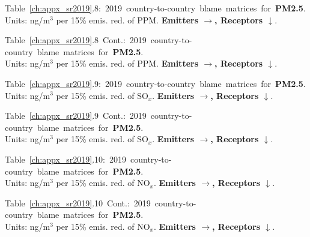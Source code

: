 \footnotesize{\mbox{Table \ref{ch:appx_sr2019}.8: 2019 country-to-country blame matrices for \textbf{PM2.5}.}\\ Units: ng/m$^3$ per 15\% emis. red. of PPM. \textbf{Emitters $\rightarrow$, Receptors $\downarrow$}. }\\[\baselineskip]\enlargethispage{\myenlarge} \hspace{-0.5cm} 
\centerline{}\clearpage
\footnotesize{\mbox{Table \ref{ch:appx_sr2019}.8 Cont.: 2019 country-to-country blame matrices for \textbf{PM2.5}.}\\ Units: ng/m$^3$ per 15\% emis. red. of PPM. \textbf{Emitters $\rightarrow$, Receptors $\downarrow$}. }\\[\baselineskip]\enlargethispage{\myenlarge} \hspace{-0.5cm} 
\centerline{}\clearpage

\footnotesize{\mbox{Table \ref{ch:appx_sr2019}.9: 2019 country-to-country blame matrices for \textbf{PM2.5}.}\\ Units: ng/m$^3$ per 15\% emis. red. of SO$_x$. \textbf{Emitters $\rightarrow$, Receptors $\downarrow$}. }\\[\baselineskip]\enlargethispage{\myenlarge} \hspace{-0.5cm} 
\centerline{}\clearpage
\footnotesize{\mbox{Table \ref{ch:appx_sr2019}.9 Cont.: 2019 country-to-country blame matrices for \textbf{PM2.5}.}\\ Units: ng/m$^3$ per 15\% emis. red. of SO$_x$. \textbf{Emitters $\rightarrow$, Receptors $\downarrow$}. }\\[\baselineskip]\enlargethispage{\myenlarge} \hspace{-0.5cm} 
\centerline{}\clearpage

\footnotesize{\mbox{Table \ref{ch:appx_sr2019}.10: 2019 country-to-country blame matrices for \textbf{PM2.5}.}\\ Units: ng/m$^3$ per 15\% emis. red. of NO$_x$. \textbf{Emitters $\rightarrow$, Receptors $\downarrow$}. }\\[\baselineskip]\enlargethispage{\myenlarge} \hspace{-0.5cm} 
\centerline{}\clearpage
\footnotesize{\mbox{Table \ref{ch:appx_sr2019}.10 Cont.: 2019 country-to-country blame matrices for \textbf{PM2.5}.}\\ Units: ng/m$^3$ per 15\% emis. red. of NO$_x$. \textbf{Emitters $\rightarrow$, Receptors $\downarrow$}. }\\[\baselineskip]\enlargethispage{\myenlarge} \hspace{-0.5cm} 
\centerline{}\clearpage

